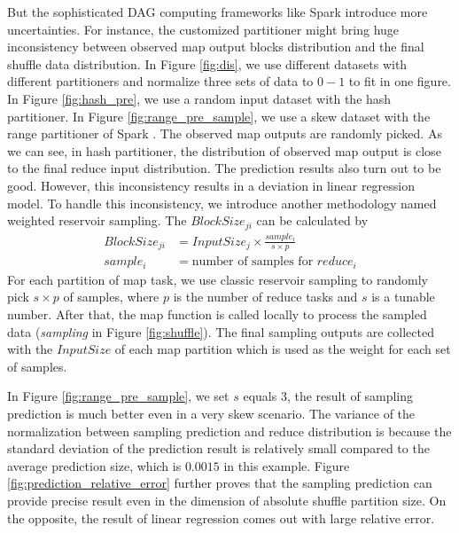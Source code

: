 But the sophisticated DAG computing frameworks like Spark introduce more uncertainties. For instance, the customized partitioner might bring huge inconsistency between observed map output blocks distribution and the final shuffle data distribution. In Figure \ref{fig:dis}, we use different datasets with different partitioners and normalize three sets of data to $0-1$ to fit in one figure. In Figure \ref{fig:hash_pre}, we use a random input dataset with the hash partitioner. In Figure \ref{fig:range_pre_sample}, we use a skew dataset with the range partitioner of Spark \cite{apachespark}.
The observed map outputs are randomly picked. As we can see, in hash partitioner, the distribution of observed map output is close to the final reduce input distribution. The prediction results also turn out to be good. However, this inconsistency results in a deviation in linear regression model.
To handle this inconsistency, we introduce another methodology named weighted reservoir sampling. The $BlockSize_{ji}$ can be calculated by
\begin{equation}
\label{equationsample}
\begin{aligned}
	BlockSize_{ji} &= {{InputSize_j \times \frac{sample_i}{s \times p}}} \\
	sample_i &= \text{number of samples for $reduce_i$}
\end{aligned}
\end{equation}
For each partition of map task, we use classic reservoir sampling to randomly pick $s \times p$ of samples, where $p$ is the number of reduce tasks and $s$ is a tunable number. After that, the map function is called locally to process the sampled data (\textit{sampling} in Figure \ref{fig:shuffle}). The final sampling outputs are collected with the $InputSize$ of each map partition which is used as the weight for each set of samples.

In Figure \ref{fig:range_pre_sample}, we set $s$ equals $3$, the result of sampling prediction is much better even in a very skew scenario. The variance of the normalization between sampling prediction and reduce distribution is because the standard deviation of the prediction result is relatively small compared to the average prediction size, which is $0.0015$ in this example. Figure \ref{fig:prediction_relative_error} further proves that the sampling prediction can provide precise result even in the dimension of absolute shuffle partition size. On the opposite, the result of linear regression comes out with large relative error.

